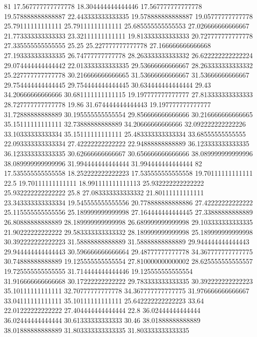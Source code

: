 81 17.567777777777778 18.304444444444446 17.567777777777778 19.578888888888887 22.443333333333335 19.578888888888887 19.05777777777778 25.79111111111111 25.79111111111111 25.685555555555553 27.026666666666667 21.773333333333333 23.32111111111111 19.813333333333333 20.727777777777778 27.335555555555555 25.25 25.227777777777778 27.166666666666668 27.193333333333335 26.74777777777778 28.263333333333332 26.622222222222224 29.074444444444442 22.013333333333335 29.53666666666667 28.263333333333332 25.227777777777778 30.216666666666665 31.53666666666667 31.53666666666667 29.754444444444445 29.754444444444445 30.634444444444444 29.43 34.20666666666666 30.681111111111115 19.197777777777777 27.813333333333333 28.727777777777778 19.86 31.674444444444443 19.197777777777777 31.72888888888889 30.195555555555554 29.856666666666666 30.216666666666665 35.15111111111111 32.73888888888889 34.20666666666666 32.092222222222226 33.10333333333334 35.15111111111111 25.483333333333334 33.68555555555555 22.093333333333334 27.42222222222222 22.94888888888889 36.123333333333335 36.123333333333335 30.62666666666667 30.656666666666666 38.089999999999996 38.089999999999996 31.994444444444444 31.994444444444444
82 17.535555555555558 18.252222222222223 17.535555555555558 19.70111111111111 22.5 19.70111111111111 18.991111111111113 25.932222222222222 25.932222222222222 25.8 27.083333333333332 21.80111111111111 23.343333333333334 19.545555555555556 20.778888888888886 27.42222222222222 25.115555555555556 25.189999999999998 27.164444444444445 27.33888888888889 26.80888888888889 28.189999999999998 26.689999999999998 29.103333333333335 21.90222222222222 29.583333333333332 28.189999999999998 25.189999999999998 30.392222222222223 31.58888888888889 31.58888888888889 29.944444444444443 29.944444444444443 30.596666666666664 29.48777777777778 34.367777777777775 30.74888888888889 19.125555555555554 27.810000000000002 28.625555555555557 19.725555555555555 31.714444444444446 19.125555555555554 31.916666666666668 30.17222222222222 29.783333333333335 30.392222222222223 35.10111111111111 32.70777777777778 34.367777777777775 31.976666666666667 33.04111111111111 35.10111111111111 25.642222222222223 33.64 22.01222222222222 27.404444444444444 22.8 36.02444444444444 36.02444444444444 30.61333333333333 30.46 38.01888888888889 38.01888888888889 31.803333333333335 31.803333333333335
